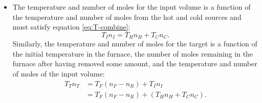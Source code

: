 \documentclass{article}
\begin{document}
\begin{itemize}
    \item
        The temperature and number of moles for the input volume is a function of the temperature
        and number of moles from the hot and cold sources and must satisfy equation
        \autoref{eq:T-combine}:
        \[
            T_I n_I = T_H n_H + T_C n_C.
        \]
        Similarly, the temperature and number of moles for the target is a function of the initial
        temperature in the furnace, the number of moles remaining in the furnace after having
        removed some amount, and the temperature and number of moles of the input volume:
        \begin{align*}
            T_T n_T
            &= T_F(n_F-n_R)+T_I n_I \\
            &= T_F(n_F-n_R)+(T_H n_H+T_C n_C).
        \end{align*}
\end{itemize}


\end{document}
